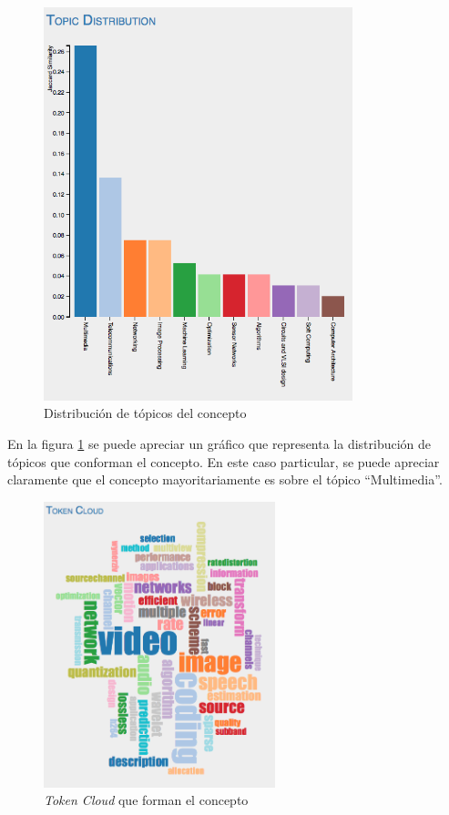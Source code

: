 \documentclass[12pt,oneside,letterpaper]{book}
\newcommand{\eng}[1]{\textit{#1}\xspace}			%
\theoremstyle{definition}
\begin{document}
 \begin{figure}[h!]
	\centering
	\includegraphics[width=0.8\textwidth]{images/results_7.png}
	\caption{Distribución de tópicos del concepto}
	\label{fig:results_7}
\end{figure}

En la figura \ref{fig:results_7} se puede apreciar un gráfico que representa la distribución de tópicos que conforman el concepto. En este caso particular, se puede apreciar claramente que el concepto mayoritariamente es sobre el tópico ``Multimedia''.

 \begin{figure}[h!]
	\centering
	\includegraphics[width=0.6\textwidth]{images/results_8.png}
	\caption{\eng{Token Cloud} que forman el concepto}
	\label{fig:results_8}
\end{figure}
\end{document}
